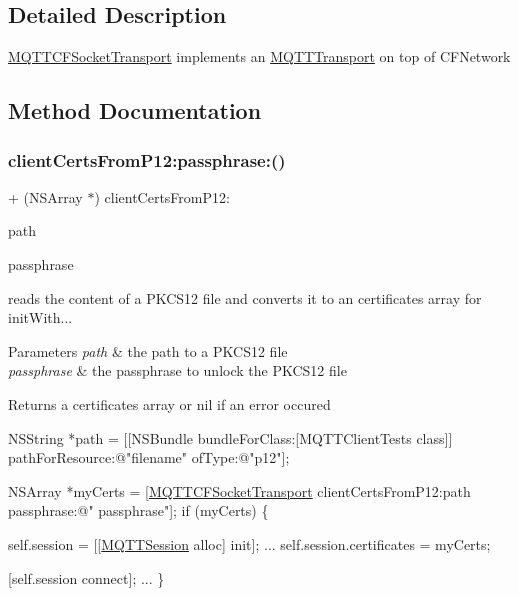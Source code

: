 \subsection{Detailed Description}
\hyperlink{interface_m_q_t_t_c_f_socket_transport}{M\+Q\+T\+T\+C\+F\+Socket\+Transport} implements an \hyperlink{interface_m_q_t_t_transport}{M\+Q\+T\+T\+Transport} on top of C\+F\+Network 

\subsection{Method Documentation}
\mbox{\label{interface_m_q_t_t_c_f_socket_transport_ad16ebe588f4117e04f908e59935f096a}} 
\subsubsection{\texorpdfstring{client\+Certs\+From\+P12\+:passphrase\+:()}{clientCertsFromP12:passphrase:()}}
{\footnotesize\ttfamily + (N\+S\+Array $\ast$) client\+Certs\+From\+P12\+: \begin{DoxyParamCaption}\item[{(N\+S\+String $\ast$)}]{path }\item[{passphrase:(N\+S\+String $\ast$)}]{passphrase }\end{DoxyParamCaption}}

reads the content of a P\+K\+C\+S12 file and converts it to an certificates array for init\+With... 
\begin{DoxyParams}{Parameters}
{\em path} & the path to a P\+K\+C\+S12 file \\
\hline
{\em passphrase} & the passphrase to unlock the P\+K\+C\+S12 file \\
\hline
\end{DoxyParams}
\begin{DoxyReturn}{Returns}
a certificates array or nil if an error occured
\end{DoxyReturn}

\begin{DoxyCode}
NSString *path = [[NSBundle bundleForClass:[MQTTClientTests \textcolor{keyword}{class}]] pathForResource:\textcolor{stringliteral}{@"filename"}
ofType:\textcolor{stringliteral}{@"p12"}];

NSArray *myCerts = [\hyperlink{interface_m_q_t_t_c_f_socket_transport}{MQTTCFSocketTransport} clientCertsFromP12:path passphrase:\textcolor{stringliteral}{@"
      passphrase"}];
\textcolor{keywordflow}{if} (myCerts) \{

\textcolor{keyword}{self}.session = [[\hyperlink{interface_m_q_t_t_session}{MQTTSession} alloc] init];
...
self.session.certificates = myCerts;

[\textcolor{keyword}{self}.session connect];
...
\}
\end{DoxyCode}
 

